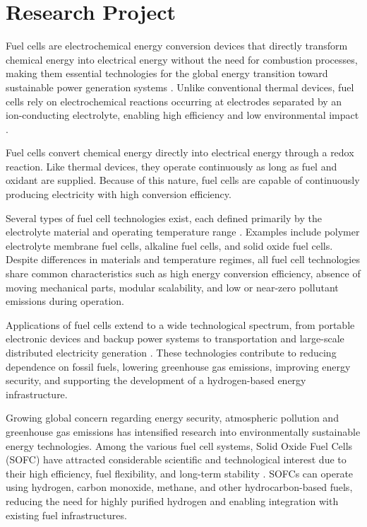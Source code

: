 \section{Research Project}

Fuel cells are electrochemical energy conversion devices that directly transform chemical energy into electrical energy without the need for combustion processes, making them essential technologies for the global energy transition toward sustainable power generation systems \cite{Nigel2017}. Unlike conventional thermal devices, fuel cells rely on electrochemical reactions occurring at electrodes separated by an ion-conducting electrolyte, enabling high efficiency and low environmental impact \cite{Gurbinder2016}.

Fuel cells convert chemical energy directly into electrical energy through a redox reaction. Like thermal devices, they operate continuously as long as fuel and oxidant are supplied. Because of this nature, fuel cells are capable of continuously producing electricity with high conversion efficiency.

Several types of fuel cell technologies exist, each defined primarily by the electrolyte material and operating temperature range \cite{Gurbinder2016,skinnerd:2008}. Examples include polymer electrolyte membrane fuel cells, alkaline fuel cells, and solid oxide fuel cells. Despite differences in materials and temperature regimes, all fuel cell technologies share common characteristics such as high energy conversion efficiency, absence of moving mechanical parts, modular scalability, and low or near-zero pollutant emissions during operation.

Applications of fuel cells extend to a wide technological spectrum, from portable electronic devices and backup power systems to transportation and large-scale distributed electricity generation \cite{BinZhu2020}. These technologies contribute to reducing dependence on fossil fuels, lowering greenhouse gas emissions, improving energy security, and supporting the development of a hydrogen-based energy infrastructure.

Growing global concern regarding energy security, atmospheric pollution and greenhouse gas emissions has intensified research into environmentally sustainable energy technologies. Among the various fuel cell systems, Solid Oxide Fuel Cells (SOFC) have attracted considerable scientific and technological interest due to their high efficiency, fuel flexibility, and long-term stability \cite{Kevin2003}. SOFCs can operate using hydrogen, carbon monoxide, methane, and other hydrocarbon-based fuels, reducing the need for highly purified hydrogen and enabling integration with existing fuel infrastructures.

